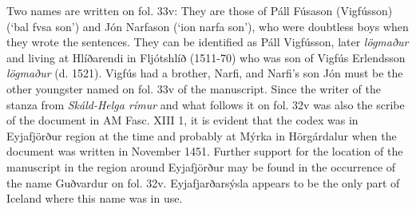 \documentclass[11pt,twoside]{article}\makeatletter
\def\ref{}
\begin{document}
Two names are written on fol. 33v: They are those of {\name Páll Fúsason (Vigfússon)} (‘bal fvsa son’) and {\name Jón Narfason} (‘ion narfa son’), who were doubtless boys when they wrote the sentences. They can be identified as Páll Vigfússon, later \textit{lögmaður} and living at {\name Hlíðarendi} in {\name Fljótshlíð} (1511-70) who was son of {\name Vigfús Erlendsson} \textit{lögmaður} (d. 1521). Vigfús had a brother, Narfi, and Narfi’s son Jón must be the other youngster named on fol. 33v of the manuscript. Since the writer of the stanza from \textit{Skáld-Helga rímur} and what follows it on fol. 32v was also the scribe of the document in {\ref AM Fasc. XIII 1}, it is evident that the codex was in {\name Eyjafjörður} region at the time and probably at {\name Mýrka} in {\name Hörgárdalur} when the document was written in November 1451. Further support for the location of the manuscript in the region around Eyjafjörður may be found in the occurrence of the name Guðvardur on fol. 32v. {\name Eyjafjarðarsýsla} appears to be the only part of {\name Iceland} where this name was in use.
\end{document}
